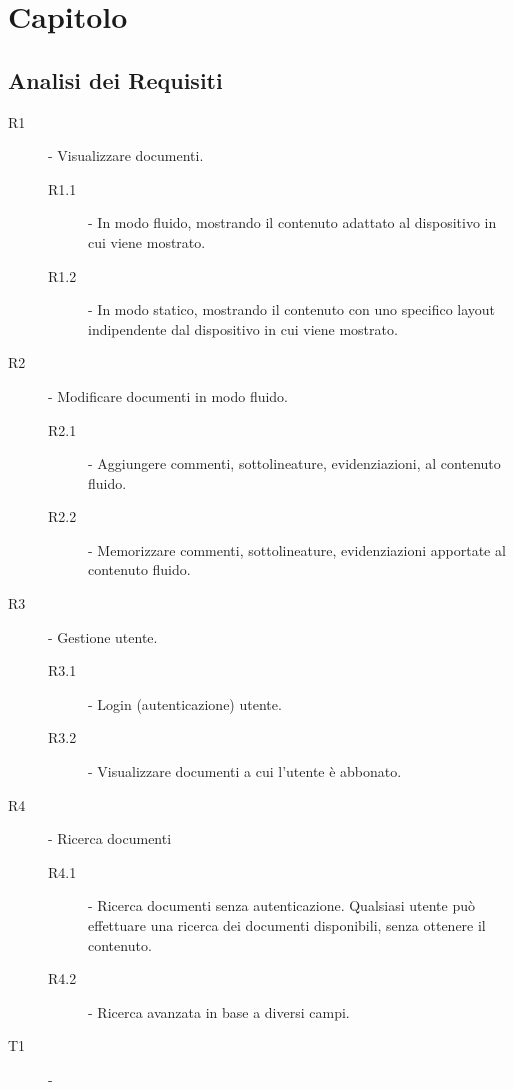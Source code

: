 \chapter{Capitolo}

\section{Analisi dei Requisiti}
\begin{description}
    \item[R1] - Visualizzare documenti.
    \begin{description}
        \item[R1.1] - In modo fluido, mostrando il contenuto adattato al dispositivo in cui viene mostrato.
        \item[R1.2] - In modo statico, mostrando il contenuto con uno specifico layout indipendente dal dispositivo in cui viene mostrato.
    \end{description}
    \item[R2] - Modificare documenti in modo fluido.
    \begin{description}
        \item[R2.1] - Aggiungere commenti, sottolineature, evidenziazioni, al contenuto fluido.
        \item[R2.2] - Memorizzare commenti, sottolineature, evidenziazioni apportate al contenuto fluido.
    \end{description}
    \item[R3] - Gestione utente.
    \begin{description}
        \item[R3.1] - Login (autenticazione) utente.
        \item[R3.2] - Visualizzare documenti a cui l'utente è abbonato.
    \end{description}
    \item[R4] - Ricerca documenti
    \begin{description}
        \item[R4.1] - Ricerca documenti senza autenticazione. Qualsiasi utente può effettuare una ricerca dei documenti disponibili, senza ottenere il contenuto.
        \item[R4.2] - Ricerca avanzata in base a diversi campi. %
    \end{description}
\end{description}


\begin{description}
    \item[T1] - 
\end{description}

